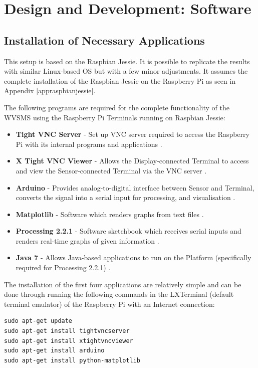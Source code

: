 \chapter{Design and Development: Software }
\label{processing}

\section{Installation of Necessary Applications}
\label{installation}

This setup is based on the Raspbian Jessie. It is possible to replicate the results with similar Linux-based OS but with a few minor adjustments. It assumes the complete installation of the Raspbian Jessie on the Raspberry Pi as seen in Appendix \ref{appraspbianjessie}. 

The following programs are required for the complete functionality of the WVSMS using the Raspberry Pi Terminals running on Raspbian Jessie: 

\begin{itemize}
	\item \textbf{Tight VNC Server} - Set up VNC server required to access the Raspberry Pi with its internal programs and applications \cite{rpitightvncserver}.
	\item \textbf{X Tight VNC Viewer} - Allows the Display-connected Terminal to access and view the Sensor-connected Terminal via the VNC server	\cite{rpitightvncserver}.
	\item \textbf{Arduino} - Provides analog-to-digital interface between Sensor and Terminal, converts the signal into a serial input for processing, and visualisation \cite{arduino}.
	\item \textbf{Matplotlib} - Software which renders graphs from text files \cite{matplotlib}.
	\item \textbf{Processing 2.2.1} - Software sketchbook which receives serial inputs and renders real-time graphs of given information \cite{processing221}.
	\item \textbf{Java 7} - Allows Java-based applications to run on the Platform (specifically required for Processing 2.2.1) \cite{java7}.
\end{itemize}

The installation of the first four applications are relatively simple and can be done through running the following commands in the LXTerminal (default terminal emulator) of the Raspberry Pi with an Internet connection: 

\begin{lstlisting}
sudo apt-get update
sudo apt-get install tightvncserver
sudo apt-get install xtightvncviewer
sudo apt-get install arduino
sudo apt-get install python-matplotlib
\end{lstlisting}

